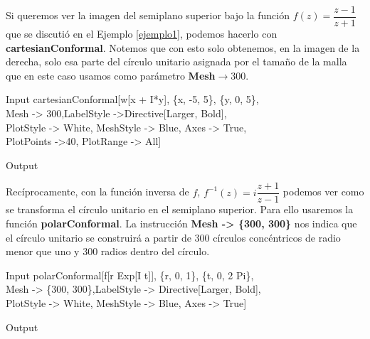 Si queremos ver la imagen del semiplano superior bajo la función $f(z)=\dfrac{z-1}{z+1}$ que se discutió en el Ejemplo \ref{ejemplo1}, podemos hacerlo con \textbf{cartesianConformal}. Notemos que con esto solo obtenemos, en la imagen de la derecha, solo esa parte del círculo unitario asignada por el tamaño de la malla que en este caso usamos como parámetro \textbf{Mesh}$\rightarrow300$.
\begin{mmaCell}{Input}
	 cartesianConformal[w[x + I*y], \{x, -5, 5\}, \{y, 0, 5\},\\Mesh -> 300,LabelStyle ->Directive[Larger, Bold],\\PlotStyle -> White, MeshStyle -> Blue, Axes -> True,\\PlotPoints ->40, PlotRange -> All]
\end{mmaCell}
\begin{mmaCell}[moregraphics={moreig={scale=0.7}}]{Output}
\end{mmaCell}
Recíprocamente, con la función inversa de $f$, $f^{-1}(z)=i\dfrac{z+1}{z-1}$ podemos ver como se transforma el círculo unitario en el semiplano superior. Para ello usaremos la función \textbf{polarConformal}. La instrucción \textbf{Mesh -> \{300, 300\}} nos indica que el círculo unitario se construirá a partir de 300 círculos concéntricos de radio menor que uno y 300 radios dentro del círculo.
\begin{mmaCell}{Input}
	  polarConformal[f[r Exp[I t]], \{r, 0, 1\}, \{t, 0, 2 Pi\},\\Mesh -> \{300, 300\},LabelStyle -> Directive[Larger, Bold],\\PlotStyle -> White, MeshStyle -> Blue, Axes -> True]
\end{mmaCell}
\begin{mmaCell}[moregraphics={moreig={scale=0.7}}]{Output}
\end{mmaCell}



